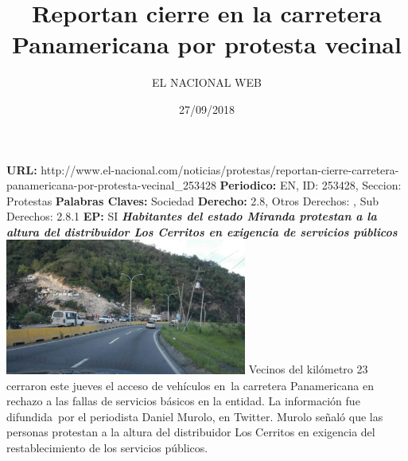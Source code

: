 \documentclass{article}%
\title{\textbf{Reportan cierre en la carretera Panamericana por protesta vecinal}}%
\author{EL NACIONAL WEB}%
\date{27/09/2018}%
\begin{document}
%
\normalsize%
\maketitle%
\textbf{URL: }%
http://www.el{-}nacional.com/noticias/protestas/reportan{-}cierre{-}carretera{-}panamericana{-}por{-}protesta{-}vecinal\_253428\newline%
%
\textbf{Periodico: }%
EN, %
ID: %
253428, %
Seccion: %
Protestas\newline%
%
\textbf{Palabras Claves: }%
Sociedad\newline%
%
\textbf{Derecho: }%
2.8, %
Otros Derechos: %
, %
Sub Derechos: %
2.8.1\newline%
%
\textbf{EP: }%
SI\newline%
\newline%
%
\textbf{\textit{Habitantes del estado Miranda protestan a la altura del distribuidor Los Cerritos en exigencia de servicios públicos~}}%
\newline%
\newline%
%
\includegraphics[width=300px]{13.jpg}%
\newline%
%
Vecinos del kilómetro 23 cerraron este jueves el acceso de vehículos en~la carretera Panamericana en rechazo a las fallas de servicios básicos en la entidad.%
\newline%
%
La información fue difundida~por el periodista Daniel Murolo, en Twitter.%
\newline%
%
Murolo señaló que las personas protestan a la altura del distribuidor Los Cerritos en exigencia del restablecimiento de los servicios públicos.%
\newline%
%
\end{document}
